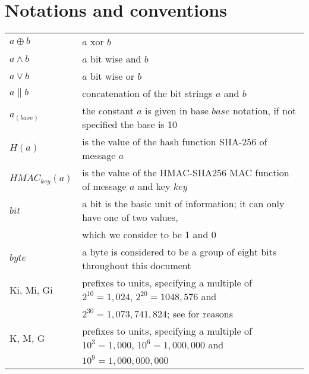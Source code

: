 \section{Notations and conventions}
\begin{tabular}{ll}
$a \oplus b$ & $a$ xor $b$ \\
$a \wedge b$ & $a$ bit wise and $b$ \\
$a \vee b$ & $a$ bit wise or $b$ \\
$a \parallel b$ & concatenation of the bit strings $a$ and $b$ \\
$a_{(base)}$ & the constant $a$ is given in base $base$ notation, if not specified the base is 10\\
$H(a)$ & is the value of the hash function SHA-256 of message $a$ \\
$HMAC_{key}(a)$ & is the value of the HMAC-SHA256 MAC function of message $a$ and key $key$ \\
$bit$ & a bit is the basic unit of information; it can only have one of two values, \\ 
& which we consider to be 1 and 0 \\
$byte$ & a byte is considered to be a group of eight bits throughout this document \\
Ki, Mi, Gi & prefixes to units, specifying a multiple of $2^{10} = 1,024$, $2^{20} = 1048,576$ and\\ & $2^{30} = 1,073,741,824$; see \cite{IEC60027-2} for reasons \\
K, M, G & prefixes to units, specifying a multiple of $10^3 = 1,000$, $10^6 = 1,000,000$ and\\ & $10^9=1,000,000,000$ \\ 
\end{tabular}